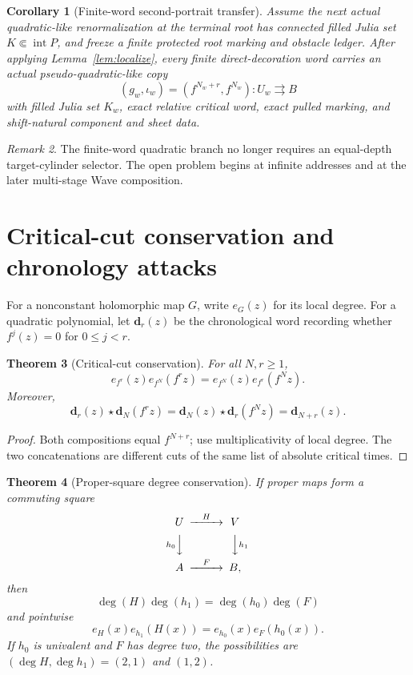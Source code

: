 \documentclass[11pt]{article}
\newtheorem{theorem}{Theorem}[section]
\newtheorem{corollary}[theorem]{Corollary}
\theoremstyle{definition}
\theoremstyle{remark}
\newtheorem{remark}[theorem]{Remark}
\begin{document}
\begin{corollary}[Finite-word second-portrait transfer]\label{cor:finiteportrait}
Assume the next actual quadratic-like renormalization at the terminal root has connected filled Julia set $K\Subset\operatorname{int}P$, and freeze a finite protected root marking and obstacle ledger.  After applying Lemma~\ref{lem:localize}, every finite direct-decoration word carries an actual pseudo-quadratic-like copy
\[
 (g_w,\iota_w)=(f^{N_w+r},f^{N_w}):U_w\rightrightarrows B
\]
with filled Julia set $K_w$, exact relative critical word, exact pulled marking, and shift-natural component and sheet data.
\end{corollary}

\begin{remark}
The finite-word quadratic branch no longer requires an equal-depth target-cylinder selector.  The open problem begins at infinite addresses and at the later multi-stage Wave composition.
\end{remark}

\section{Critical-cut conservation and chronology attacks}

For a nonconstant holomorphic map $G$, write $e_G(z)$ for its local degree.  For a quadratic polynomial, let $\mathbf d_r(z)$ be the chronological word recording whether $f^j(z)=0$ for $0\le j<r$.

\begin{theorem}[Critical-cut conservation]\label{thm:cut}
For all $N,r\ge1$,
\[
 e_{f^r}(z)e_{f^N}(f^rz)=e_{f^N}(z)e_{f^r}(f^Nz).
\]
Moreover,
\[
 \mathbf d_r(z)\star\mathbf d_N(f^rz)
 =\mathbf d_N(z)\star\mathbf d_r(f^Nz)
 =\mathbf d_{N+r}(z).
\]
\end{theorem}

\begin{proof}
Both compositions equal $f^{N+r}$; use multiplicativity of local degree.  The two concatenations are different cuts of the same list of absolute critical times.
\end{proof}

\begin{theorem}[Proper-square degree conservation]\label{thm:square}
If proper maps form a commuting square
\[
\begin{CD}
U @>H>> V\\
@Vh_0VV @VVh_1V\\
A @>F>> B,
\end{CD}
\]
then
\[
 \deg(H)\deg(h_1)=\deg(h_0)\deg(F)
\]
and pointwise
\[
 e_H(x)e_{h_1}(H(x))=e_{h_0}(x)e_F(h_0(x)).
\]
If $h_0$ is univalent and $F$ has degree two, the possibilities are $(\deg H,\deg h_1)=(2,1)$ and $(1,2)$.
\end{theorem}
\end{document}
